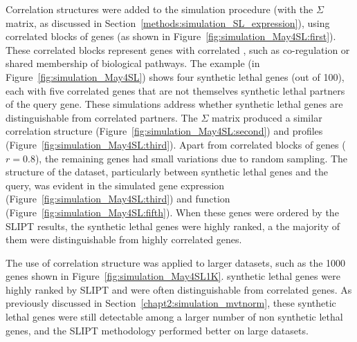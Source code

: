 Correlation structures were added to the simulation procedure (with the $\Sigma$ matrix, as discussed in Section~\ref{methods:simulation_SL_expression}), using correlated blocks of genes (as shown in Figure~\ref{fig:simulation_May4SL:first}). These correlated blocks represent genes with correlated , such as co-regulation or shared membership of biological pathways. The example (in Figure~\ref{fig:simulation_May4SL}) shows four \gls{synthetic lethal} genes (out of 100), each with five correlated genes that are not themselves \gls{synthetic lethal} partners of the query gene. These simulations address whether \gls{synthetic lethal} genes are distinguishable from correlated partners. The $\Sigma$ matrix produced a similar correlation structure (Figure~\ref{fig:simulation_May4SL:second}) and  profiles (Figure~\ref{fig:simulation_May4SL:third}).  Apart from correlated blocks of genes ($r = 0.8$), the remaining genes had small variations due to random sampling. The structure of the dataset, particularly between \gls{synthetic lethal} genes and the query, was evident in the simulated \gls{gene expression} (Figure~\ref{fig:simulation_May4SL:third}) and function (Figure~\ref{fig:simulation_May4SL:fifth}). When these genes were ordered by the \gls{SLIPT} results, the \gls{synthetic lethal} genes were highly ranked, a the majority of them were distinguishable from highly correlated genes.

The use of correlation structure was applied to larger datasets, such as the 1000 genes shown in Figure~\ref{fig:simulation_May4SL1K}. \Gls{synthetic lethal} genes were highly ranked by \gls{SLIPT} and were often distinguishable from correlated genes. As previously discussed in Section~\ref{chapt2:simulation_mvtnorm}, these \gls{synthetic lethal} genes were still detectable among a larger number of non synthetic lethal genes, and the \gls{SLIPT} methodology performed better on large datasets.


